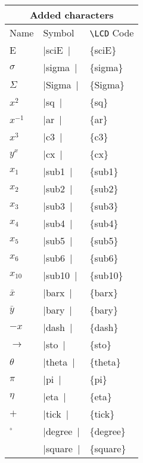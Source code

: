 \documentclass[a4paper,12pt]{article}
\newcommand{\LCDsymb}[1]{\large \textLCD{1}|{#1}~|}
\newcommand{\printcmd}[1]{\texttt{\textbackslash #1}}
\begin{document}
\begin{center}
	\begin{tabular}{|l|l|>{\ttfamily}l|}
		\multicolumn{3}{c}{\textbf{Added characters}} \\
		\hline
		Name             & Symbol              & \textnormal{\printcmd{LCD} Code} \\
		\hline
		E                & \LCDsymb{sciE}      & \{sciE\} \\
		$\sigma$         & \LCDsymb{sigma}     & \{sigma\} \\
		$\Sigma$         & \LCDsymb{Sigma}     & \{Sigma\} \\
		$x^2$            & \LCDsymb{sq}        & \{sq\} \\
		$x^{-1}$         & \LCDsymb{ar}        & \{ar\} \\
		$x^3$            & \LCDsymb{c3}        & \{c3\} \\
		$y^x$            & \LCDsymb{cx}        & \{cx\} \\
		$x_1$            & \LCDsymb{sub1}      & \{sub1\} \\
		$x_2$            & \LCDsymb{sub2}      & \{sub2\} \\
		$x_3$            & \LCDsymb{sub3}      & \{sub3\} \\
		$x_4$            & \LCDsymb{sub4}      & \{sub4\} \\
		$x_5$            & \LCDsymb{sub5}      & \{sub5\} \\
		$x_6$            & \LCDsymb{sub6}      & \{sub6\} \\
		$x_{10}$         & \LCDsymb{sub10}     & \{sub10\} \\
		$\bar x$         & \LCDsymb{barx}      & \{barx\} \\
		$\bar y$         & \LCDsymb{bary}      & \{bary\} \\
		$-x$             & \LCDsymb{dash}      & \{dash\} \\
		$\rightarrow$    & \LCDsymb{sto}       & \{sto\} \\
		$\theta$         & \LCDsymb{theta}     & \{theta\} \\
		$\pi$            & \LCDsymb{pi}        & \{pi\} \\
		$\eta$           & \LCDsymb{eta}       & \{eta\} \\
		$+$              & \LCDsymb{tick}      & \{tick\} \\
		$^\circ$         & \LCDsymb{degree}    & \{degree\} \\
		                 & \LCDsymb{square}    & \{square\} \\

\end{tabular}
\end{center}
\end{document}
